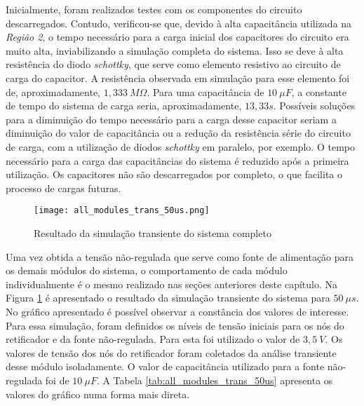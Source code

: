 Inicialmente, foram realizados testes com os componentes do circuito descarregados. Contudo, verificou-se que, devido à alta capacitância utilizada na \textit{Região 2}, o tempo necessário para a carga inicial dos capacitores do circuito era muito alta, inviabilizando a simulação completa do sistema. Isso se deve à alta resistência do diodo \textit{schottky}, que serve como elemento resistivo ao circuito de carga do capacitor. A resistência observada em simulação para esse elemento foi de, aproximadamente, $1,333~M\Omega$. Para uma capacitância de $10~\mu F$, a constante de tempo do sistema de carga seria, aproximadamente, $13,33 s$. Possíveis soluções para a diminuição do tempo necessário para a carga desse capacitor seriam a diminuição do valor de capacitância ou a redução da resistência série do circuito de carga, com a utilização de diodos \textit{schottky} em paralelo, por exemplo. O tempo necessário para a carga das capacitâncias do sistema é reduzido após a primeira utilização. Os capacitores não são descarregados por completo, o que facilita o processo de cargas futuras.

\begin{figure}[!h]
	\caption{\label{fig:all_modules_trans_50us}Resultado da simulação transiente do sistema completo}
	\begin{center}
		\texttt{[image: all\_modules\_trans\_50us.png]}
	\end{center}
\end{figure}

Uma vez obtida a tensão não-regulada que serve como fonte de alimentação para os demais módulos do sistema, o comportamento de cada módulo individualmente é o mesmo realizado nas seções anteriores deste capítulo. Na Figura \ref{fig:all_modules_trans_50us} é apresentado o resultado da simulação transiente do sistema para $50~\mu s$. No gráfico apresentado é possível observar a constância dos valores de interesse. Para essa simulação, foram definidos os níveis de tensão iniciais para os nós do retificador e da fonte não-regulada. Para esta foi utilizado o valor de $3,5~V$. Os valores de tensão dos nós do retificador foram coletados da análise transiente desse módulo isoladamente. O valor de capacitância utilizado para a fonte não-regulada foi de $10~\mu F$. A Tabela \ref{tab:all_modules_trans_50us} apresenta os valores do gráfico numa forma mais direta.

